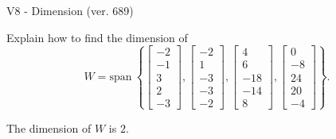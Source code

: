 \begin{exercise}
  \begin{exerciseTitle}V8 - Dimension (ver. 689)\end{exerciseTitle}
  \begin{exerciseStatement}
    Explain how to find the dimension of 
\[W=\mathrm{span}\ \left\{\left[\begin{array}{r}
-2 \\
-1 \\
3 \\
2 \\
-3
\end{array}\right] , \left[\begin{array}{r}
-2 \\
1 \\
-3 \\
-3 \\
-2
\end{array}\right] , \left[\begin{array}{r}
4 \\
6 \\
-18 \\
-14 \\
8
\end{array}\right] , \left[\begin{array}{r}
0 \\
-8 \\
24 \\
20 \\
-4
\end{array}\right]\right\}.\]



  \end{exerciseStatement}
  \begin{exerciseAnswer}
   The dimension of \(W\) is  \(2\).
  


  \end{exerciseAnswer}
\end{exercise}